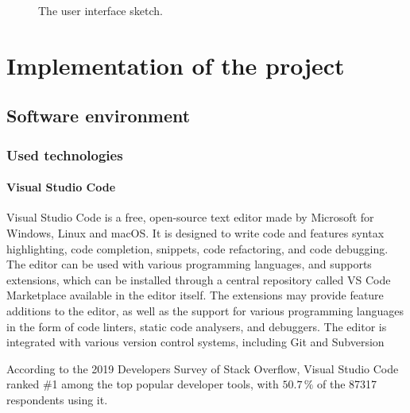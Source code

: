 \documentclass[english,engineering]{wizthesis}
\newcommand{\todo}[1]{%
  \textcolor{red}{[\textbf{TODO}\ifx&#1&{}\else{ }\fi\emph{#1}]}%
}
\begin{document}
\begin{figure}[H]
  \centering
  \caption{The user interface sketch.}
  \label{fig:interface-prototype}
\end{figure}

\chapter{Implementation of the project} \label{ch:implementation-of-the-project}

\section{Software environment}

\subsection{Used technologies} \label{sbs:used-technologies}

\subsubsection*{Visual Studio Code}

Visual Studio Code \cite{vs-code} is a free, open-source text editor made by
Microsoft for Windows, Linux and macOS. It is designed to write code and
features syntax highlighting, code completion, snippets, code refactoring, and
code debugging. The editor can be used with various programming languages, and
supports extensions, which can be installed through a central repository called
VS Code Marketplace available in the editor itself. The extensions may provide
feature additions to the editor, as well as the support for various programming
languages in the form of code linters, static code analysers, and debuggers. The
editor is integrated with various version control systems, including Git and
Subversion

According to the 2019 Developers Survey of Stack Overflow, Visual Studio Code
ranked \#1 among the top popular developer tools, with $50.7\,\%$ of the 87317
respondents using it. \cite{stack-overflow-insights-2019}
\end{document}
